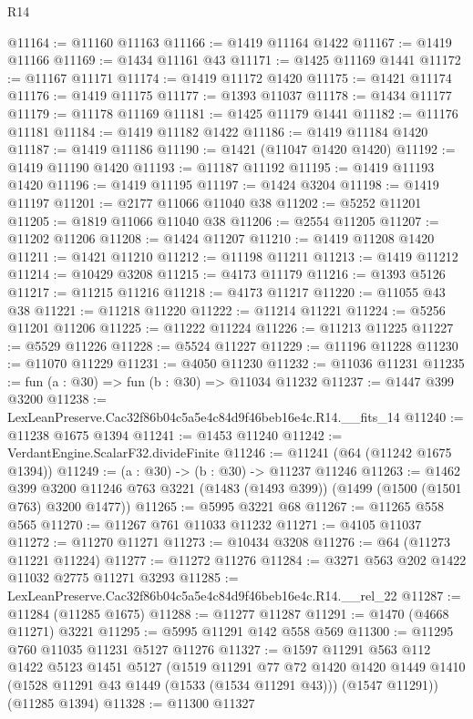 \begin{lexlean}{R14}
\begin{coremodule}
@11164 := @11160 @11163
@11166 := @1419 @11164 @1422
@11167 := @1419 @11166
@11169 := @1434 @11161 @43
@11171 := @1425 @11169 @1441
@11172 := @11167 @11171
@11174 := @1419 @11172 @1420
@11175 := @1421 @11174
@11176 := @1419 @11175
@11177 := @1393 @11037
@11178 := @1434 @11177
@11179 := @11178 @11169
@11181 := @1425 @11179 @1441
@11182 := @11176 @11181
@11184 := @1419 @11182 @1422
@11186 := @1419 @11184 @1420
@11187 := @1419 @11186
@11190 := @1421 (@11047 @1420 @1420)
@11192 := @1419 @11190 @1420
@11193 := @11187 @11192
@11195 := @1419 @11193 @1420
@11196 := @1419 @11195
@11197 := @1424 @3204
@11198 := @1419 @11197
@11201 := @2177 @11066 @11040 @38
@11202 := @5252 @11201
@11205 := @1819 @11066 @11040 @38
@11206 := @2554 @11205
@11207 := @11202 @11206
@11208 := @1424 @11207
@11210 := @1419 @11208 @1420
@11211 := @1421 @11210
@11212 := @11198 @11211
@11213 := @1419 @11212
@11214 := @10429 @3208
@11215 := @4173 @11179
@11216 := @1393 @5126
@11217 := @11215 @11216
@11218 := @4173 @11217
@11220 := @11055 @43 @38
@11221 := @11218 @11220
@11222 := @11214 @11221
@11224 := @5256 @11201 @11206
@11225 := @11222 @11224
@11226 := @11213 @11225
@11227 := @5529 @11226
@11228 := @5524 @11227
@11229 := @11196 @11228
@11230 := @11070 @11229
@11231 := @4050 @11230
@11232 := @11036 @11231
@11235 := fun (a : @30) => fun (b : @30) => @11034 @11232
@11237 := @1447 @399 @3200
@11238 := LexLeanPreserve.Cac32f86b04c5a5e4c84d9f46beb16e4c.R14.__fits_14
@11240 := @11238 @1675 @1394
@11241 := @1453 @11240
@11242 := VerdantEngine.ScalarF32.divideFinite
@11246 := @11241 (@64 (@11242 @1675 @1394))
@11249 := (a : @30) -> (b : @30) -> @11237 @11246
@11263 := @1462
    @399
    @3200
    @11246
    @763
    @3221
    (@1483 (@1493 @399))
    (@1499 (@1500 (@1501 @763) @3200 @1477))
@11265 := @5995 @3221 @68
@11267 := @11265 @558 @565
@11270 := @11267 @761 @11033 @11232
@11271 := @4105 @11037
@11272 := @11270 @11271
@11273 := @10434 @3208
@11276 := @64 (@11273 @11221 @11224)
@11277 := @11272 @11276
@11284 := @3271 @563 @202 @1422 @11032 @2775 @11271 @3293
@11285 := LexLeanPreserve.Cac32f86b04c5a5e4c84d9f46beb16e4c.R14.__rel_22
@11287 := @11284 (@11285 @1675)
@11288 := @11277 @11287
@11291 := @1470 (@4668 @11271) @3221
@11295 := @5995 @11291 @142 @558 @569
@11300 := @11295 @760 @11035 @11231 @5127 @11276
@11327 := @1597
    @11291
    @563
    @112
    @1422
    @5123
    @1451
    @5127
    (@1519
      @11291
      @77
      @72
      @1420
      @1420
      @1449
      @1410
      (@1528 @11291 @43 @1449 (@1533 (@1534 @11291 @43)))
      (@1547 @11291))
    (@11285 @1394)
@11328 := @11300 @11327

\end{coremodule}
\end{lexlean}
